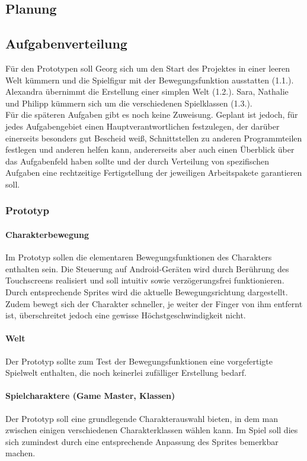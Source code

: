 \documentclass[10pt,a4paper,notitlepage]{report}
\begin{document}
\begin{flushleft}
\chapter{Planung}
\section{Aufgabenverteilung}
Für den Prototypen soll Georg sich um den Start des Projektes in einer leeren Welt kümmern und die Spielfigur mit der Bewegungsfunktion ausstatten (1.1.). Alexandra übernimmt die Erstellung einer simplen Welt (1.2.). Sara, Nathalie und Philipp kümmern sich um die verschiedenen Spielklassen (1.3.).\\
Für die späteren Aufgaben gibt es noch keine Zuweisung. Geplant ist jedoch, für jedes Aufgabengebiet einen Hauptverantwortlichen festzulegen, der darüber einerseits besonders gut Bescheid weiß, Schnittstellen zu anderen Programmteilen festlegen und anderen helfen kann, andererseits aber auch einen Überblick über das Aufgabenfeld haben sollte und der durch Verteilung von spezifischen Aufgaben eine rechtzeitige Fertigstellung der jeweiligen Arbeitspakete garantieren soll.\\
\subsection{Prototyp}

\subsubsection{Charakterbewegung}
Im Prototyp sollen die elementaren Bewegungsfunktionen des Charakters enthalten sein. Die Steuerung auf Android-Geräten wird durch Berührung des Touchscreens realisiert und soll intuitiv sowie verzögerungsfrei funktionieren. Durch entsprechende Sprites wird die aktuelle Bewegungsrichtung dargestellt. Zudem bewegt sich der Charakter schneller, je weiter der Finger von ihm entfernt ist, überschreitet jedoch eine gewisse Höchstgeschwindigkeit nicht.

\subsubsection{Welt}
Der Prototyp sollte zum Test der Bewegungsfunktionen eine vorgefertigte Spielwelt enthalten, die noch keinerlei zufälliger Erstellung bedarf.

\subsubsection{Spielcharaktere (Game Master, Klassen)}
Der Prototyp soll eine grundlegende Charakterauswahl bieten, in dem man zwischen einigen verschiedenen Charakterklassen wählen kann. Im Spiel soll dies sich zumindest durch eine entsprechende Anpassung des Sprites bemerkbar machen.


\end{flushleft}
\end{document}
